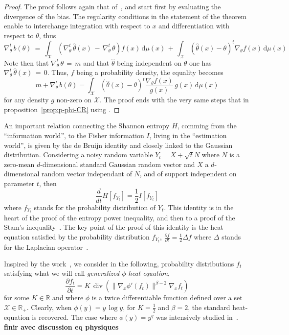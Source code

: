 \documentclass[english,sort&compress]{elsarticle}
\theoremstyle{definition}
\theoremstyle{plain}
\theoremstyle{plain}
\def\dmu{\mathrm{d}\mu}
\def\Rset{\mathbb{R}}
\def\X{\mathcal{X}}
\def\div{\operatorname{div}}
\begin{document}
\begin{proof}
  The proof  follows again that  of~\cite{Ber13}, and start first  by evaluating
  the divergence of the bias.  The regularity conditions in the statement of the
  theorem   enable  to  interchange   integration  with   respect  to   $x$  and
  differentiation with respect to $\theta$, thus
  \[
  \nabla_\theta^t  \,  b(\theta)  \:  =  \: \int_\X  \left(  \nabla_\theta^t  \,
    \widehat{\theta}(x)  \,  - \,  \nabla_\theta^t  \,  \theta  \right) f(x)  \,
  \dmu(x)  \,  +  \,  \int_\X  \left(  \widehat{\theta}(x)  -  \theta  \right)^t
  \nabla_\theta f(x) \, \dmu(x)
  \]
  Note   then  that   $\nabla_\theta^t  \,   \theta  \,   =  \,   m$   and  that
  $\widehat{\theta}$  being independent  on  $\theta$ one  has $\nabla_\theta^t  \,
  \widehat{\theta}(x) \,  = \, 0$. Thus,  $f$ being a  probability density, the
  equality becomes
  \[
  m + \nabla_\theta^t \, b(\theta) = \int_\X \left( \widehat{\theta}(x) - \theta
  \right)^t \frac{\nabla_\theta f(x)}{g(x)} \, g(x) \, \dmu(x)
  \]
  for any density $g$ non-zero on $\X$.  The proof ends with the very same steps
  that in proposition~\ref{prop:p-phi-CR} using \cite[Lemma2]{Ber13}.
\end{proof}

An  important relation  connecting the  Shannon  entropy $H$,  comming from  the
``information world'', to the Fisher information $I$, living in the ``estimation
world'', is given  by the de Bruijn identity and closely  linked to the Gaussian
distribution. Considering a  noisy random variable $Y_t = X  + \sqrt{t} N$ where
$N$ is  a zero-mean  $d$-dimensional standard Gaussian  random vector and  $X$ a
$d$-dimensional random vector independant of  $N$, and of support independent on
parameter  $t$,  then $$\frac{d}{dt}  H[f_{Y_t}]  =  \frac12 I[f_{Y_t}]$$  where
$f_{Y_t}$ stands for the probability  distribution of $Y_t$. This identity is in
the heart of the  proof of the entropy power inequality, and  then to a proof of
the  Stam's inequality~\cite{CovTho06}.  The  key  point of  the  proof of  this
identity  is  the  heat  equation  satisfied  by  the  probability  distribution
$f_{Y_t}$,  $\frac{\partial f}{\partial t}  = \frac12  \Delta f$  where $\Delta$
stands for the Laplacian operator~\cite{Wid75}.

Inspired by the work~\cite{Ber13:08},  we consider in the following, probability
distributions $f_t$  satisfying what we  will call {\em  generalized $\phi$-heat
  equation},
%
\begin{equation}
\label{eq:phi-heat_equation}
\frac{\partial f_t}{\partial t} = K \, \div\left( \| \nabla_x \phi'(f_t) \|^{\beta-2}
\nabla_x f_t \right)
\end{equation}
%
for  some $K  \in \Rset$  and where  $\phi$ is  a twice  differentiable function
defined over a set $\X \in \Rset_+$.  Clearly, when $\phi(y) = y \, \log y$, for
$K =  \frac12$ and $\beta  = 2$, the  standard heat-equation is  recovered.  The
case  where $\phi(y) =  y^q$ was  intensively studied  in~\cite{Ber13:08}.  {\bf
  finir avec discussion eq physiques}
\end{document}
